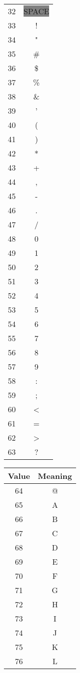 {\begin{tabular}{c c}
  \hline
   32 & \colorbox{gray}{SPACE} \\
   33 & ! \\
   34 & " \\
   35 & \# \\
   36 & \$ \\
   37 & \% \\
   38 & \& \\
   39 & ' \\
   40 & ( \\
   41 & ) \\
   42 & * \\
   43 & + \\
   44 & , \\
   45 & - \\
   46 & . \\
   47 & / \\
   48 & 0 \\
   49 & 1 \\
   50 & 2 \\
   51 & 3 \\
   52 & 4 \\
   53 & 5 \\
   54 & 6 \\
   55 & 7 \\
   56 & 8 \\
   57 & 9 \\
   58 & : \\
   59 & ; \\
   60 & < \\
   61 & = \\
   62 & > \\
   63 & ? \\
\end{tabular}
\quad
\begin{tabular}{c c}
  \hline
  Value & Meaning \\
  \hline
   64 & @ \\
   65 & A \\
   66 & B \\
   67 & C \\
   68 & D \\
   69 & E \\
   70 & F \\
   71 & G \\
   72 & H \\
   73 & I \\
   74 & J \\
   75 & K \\
   76 & L \\

\end{tabular}}
